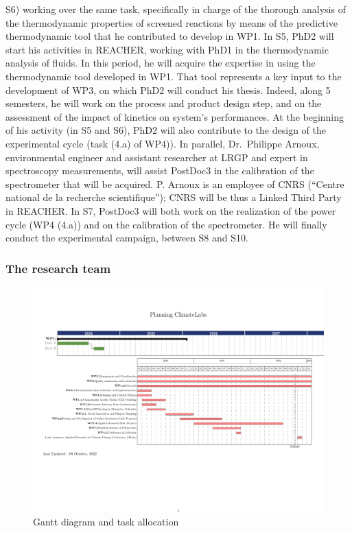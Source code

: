 \documentclass[
  12pt,
  a4paperpaper,
  onecolumn]{article}
\begin{document}
S6) working over the same task, specifically in charge of the thorough
analysis of the thermodynamic properties of screened reactions by means
of the predictive thermodynamic tool that he contributed to develop in
WP1. In S5, PhD2 will start his activities in REACHER, working with PhD1
in the thermodynamic analysis of fluids. In this period, he will acquire
the expertise in using the thermodynamic tool developed in WP1. That
tool represents a key input to the development of WP3, on which PhD2
will conduct his thesis. Indeed, along 5 semesters, he will work on the
process and product design step, and on the assessment of the impact of
kinetics on system's performances. At the beginning of his activity (in
S5 and S6), PhD2 will also contribute to the design of the experimental
cycle (task (4.a) of WP4)). In parallel, Dr.~Philippe Arnoux,
environmental engineer and assistant researcher at LRGP and expert in
spectroscopy measurements, will assist PostDoc3 in the calibration of
the spectrometer that will be acquired. P. Arnoux is an employee of CNRS
(``Centre national de la recherche scientifique''); CNRS will be thus a
Linked Third Party in REACHER. In S7, PostDoc3 will both work on the
realization of the power cycle (WP4 (4.a)) and on the calibration of the
spectrometer. He will finally conduct the experimental campaign, between
S8 and S10.

\hypertarget{the-research-team}{%
\subsubsection{The research team}\label{the-research-team}}

\begin{figure}
\centering
    \includegraphics[width=0.9\linewidth]{Gantt/Gantt-B1.pdf}
    \caption{Gantt diagram and task allocation}
    \label{fig:gantt-b1}
\end{figure}
\end{document}
